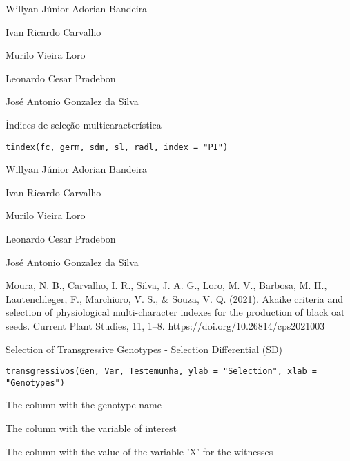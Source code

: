 \documentclass[a4paper]{book}
\begin{document}
%
\begin{Author}
Willyan Júnior Adorian Bandeira

Ivan Ricardo Carvalho

Murilo Vieira Loro

Leonardo Cesar Pradebon

José Antonio Gonzalez da Silva
\end{Author}
%
\begin{Description}
Índices de seleção multicaracterística
\end{Description}
%
\begin{Usage}
\begin{verbatim}
tindex(fc, germ, sdm, sl, radl, index = "PI")
\end{verbatim}
\end{Usage}
%
\begin{Author}
Willyan Júnior Adorian Bandeira

Ivan Ricardo Carvalho

Murilo Vieira Loro

Leonardo Cesar Pradebon

José Antonio Gonzalez da Silva
\end{Author}
%
\begin{References}
Moura, N. B., Carvalho, I. R., Silva, J. A. G., Loro, M. V., Barbosa, M. H.,
Lautenchleger, F., Marchioro, V. S., \& Souza, V. Q. (2021). Akaike criteria
and selection of physiological multi-character indexes for the production of
black oat seeds. Current Plant Studies, 11, 1–8.
https://doi.org/10.26814/cps2021003
\end{References}
%
\begin{Description}
Selection of Transgressive Genotypes - Selection Differential (SD)
\end{Description}
%
\begin{Usage}
\begin{verbatim}
transgressivos(Gen, Var, Testemunha, ylab = "Selection", xlab = "Genotypes")
\end{verbatim}
\end{Usage}
%
\begin{Arguments}
\begin{ldescription}
\item[\code{Gen}] The column with the genotype name

\item[\code{Var}] The column with the variable of interest

\item[\code{Witness}] The column with the value of the variable 'X' for the witnesses
\end{ldescription}
\end{Arguments}
\end{document}
